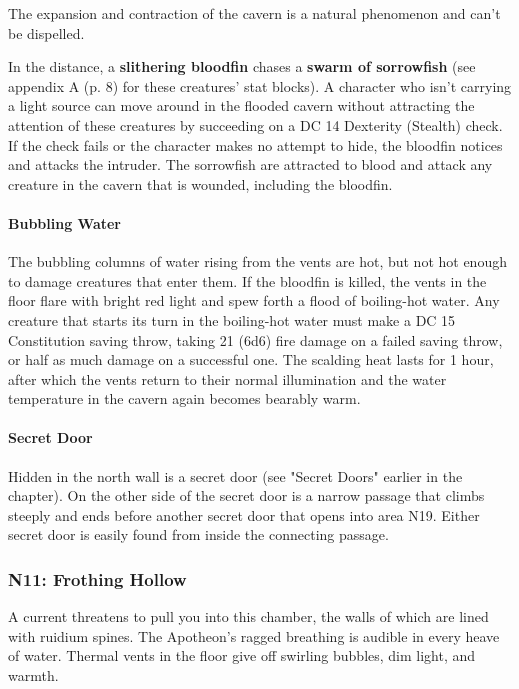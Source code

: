 \documentclass[letterpaper, 11pt, bg=full, twocolumn]{dndbook}
\begin{document}
The expansion and contraction of the cavern is a natural phenomenon and can't be dispelled.

In the distance, a \textbf{slithering bloodfin} chases a \textbf{swarm of sorrowfish} (see appendix A (p. 8) for these creatures' stat blocks). A character who isn't carrying a light source can move around in the flooded cavern without attracting the attention of these creatures by succeeding on a DC 14 Dexterity (Stealth) check. If the check fails or the character makes no attempt to hide, the bloodfin notices and attacks the intruder. The sorrowfish are attracted to blood and attack any creature in the cavern that is wounded, including the bloodfin.

\paragraph{Bubbling Water}

The bubbling columns of water rising from the vents are hot, but not hot enough to damage creatures that enter them. If the bloodfin is killed, the vents in the floor flare with bright red light and spew forth a flood of boiling-hot water. Any creature that starts its turn in the boiling-hot water must make a DC 15 Constitution saving throw, taking 21 (6d6) fire damage on a failed saving throw, or half as much damage on a successful one. The scalding heat lasts for 1 hour, after which the vents return to their normal illumination and the water temperature in the cavern again becomes bearably warm.

\paragraph{Secret Door}

Hidden in the north wall is a secret door (see "Secret Doors" earlier in the chapter). On the other side of the secret door is a narrow passage that climbs steeply and ends before another secret door that opens into area N19. Either secret door is easily found from inside the connecting passage.

\subsubsection{N11: Frothing Hollow}

\begin{DndReadAloud}
A current threatens to pull you into this chamber, the walls of which are lined with ruidium spines. The Apotheon's ragged breathing is audible in every heave of water. Thermal vents in the floor give off swirling bubbles, dim light, and warmth.
\end{DndReadAloud}
\end{document}
